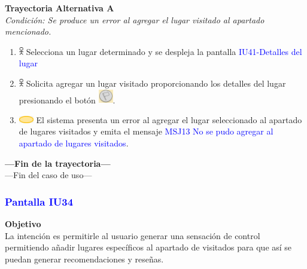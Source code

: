 \textbf{Trayectoria Alternativa A}\\
\textit{Condición: Se produce un error al agregar el lugar visitado al apartado mencionado.}
\begin{enumerate}
    \item \includegraphics[width=0.0150\textwidth]{Figuras/persona.png} Selecciona un lugar determinado y se despleja la pantalla {\textcolor{blue}{IU41-Detalles del lugar}}
    \item \includegraphics[width=0.0150\textwidth]{Figuras/persona.png} Solicita agregar un lugar visitado proporcionando los detalles del lugar presionando el botón \includegraphics[width=0.0500\textwidth]{ComponentesCU/MarcarVisitado.PNG}.
    \item \includegraphics[width=0.0500\textwidth]{Figuras/sistema.png} El sistema presenta un error al agregar el lugar seleccionado al apartado de lugares visitados y emita el mensaje {\textcolor{blue}{MSJ13 No se pudo agregar al apartado de lugares visitados}}.
\end{enumerate}
\textbf{---Fin de la trayectoria---}
\vspace{0.5cm}\\
---Fin del caso de uso---
\newpage

\subsubsection{\textcolor{blue}{Pantalla IU34}}
\textbf{Objetivo} \\
La intención es permitirle al usuario generar una sensación de control permitiendo añadir lugares específicos al apartado de visitados para que así se puedan generar recomendaciones y reseñas.
\vspace{15pt}

